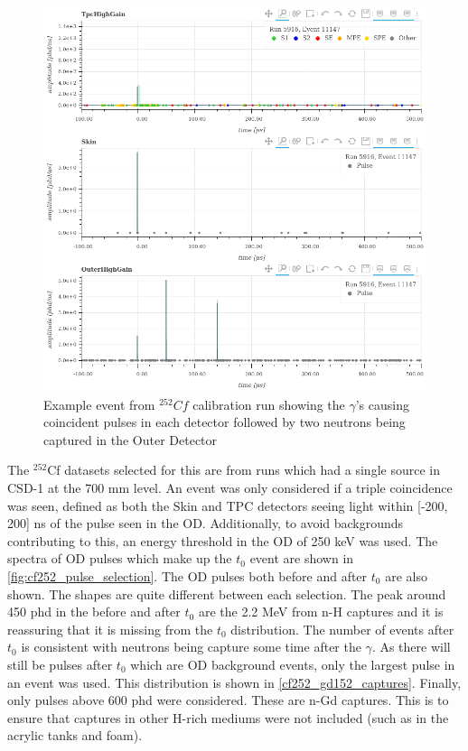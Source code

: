 \begin{figure}[!htbp]
\includegraphics[width=\textwidth]{Figures/NeutronCaptureTime/cf252_eventviewer_5916.png}
\centering
\caption{Example event from ${}^{252}{Cf}$ calibration run showing the $\gamma$'s causing coincident pulses in each detector followed by two neutrons being captured in the Outer Detector}
\label{fig:cf252_event_viewer}
\end{figure}

\par
The ${}^{252}$Cf datasets selected for this are from runs which had a single source in CSD-1 at the 700 mm level.
An event was only considered if a triple coincidence was seen, defined as both the Skin and TPC detectors seeing light within [-200, 200] ns of the pulse seen in the OD.
Additionally, to avoid backgrounds contributing to this, an energy threshold in the OD of 250 keV was used.
The spectra of OD pulses which make up the $t_0$ event are shown in \autoref{fig:cf252_pulse_selection}.
The OD pulses both before and after $t_0$ are also shown.
The shapes are quite different between each selection.
The peak around 450 phd in the before and after $t_0$ are the 2.2 MeV from n-H captures and it is reassuring that it is missing from the $t_0$ distribution.
The number of events after $t_0$ is consistent with neutrons being capture some time after the $\gamma$.
As there will still be pulses after $t_0$ which are OD background events, only the largest pulse in an event was used.
This distribution is shown in \autoref{cf252_gd152_captures}.
Finally, only pulses above 600 phd were considered.
These are n-Gd captures.
This is to ensure that captures in other H-rich mediums were not included (such as in the acrylic tanks and foam).

